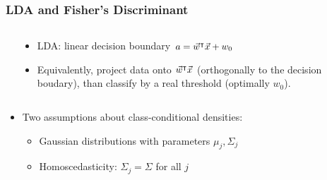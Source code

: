 \begin{frame}
\frametitle{LDA and Fisher's Discriminant}
\begin{columns}
\begin{column}{.5\linewidth}
\end{column}
\begin{column}{.6\linewidth}
\begin{itemize}
\item LDA: linear decision boundary $a = \vec{w}^\intercal \vec{x} + w_0$
\pause
\item Equivalently, project data onto $\vec{w}^\intercal \vec{x}$ (orthogonally to the decision boudary), than classify by a real threshold (optimally $w_0$). \\
\end{itemize}
\end{column}
\end{columns}
\pause
\begin{itemize}
\item Two assumptions about class-conditional densities: 
\begin{itemize}
\item Gaussian distributions with parameters $\mu_j, \Sigma_j$
\item Homoscedasticity: $\Sigma_j=\Sigma$ for all $j$
\end{itemize}
\end{itemize}


\end{frame}
